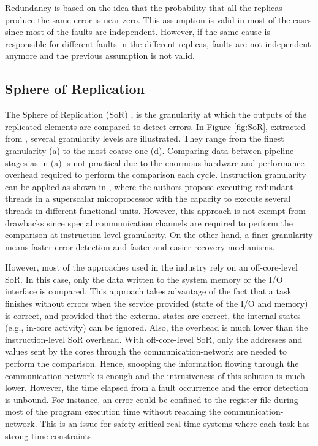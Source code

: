 Redundancy is based on the idea that the probability that all the replicas produce the same error is near zero. This assumption is valid in most of the cases since most of the faults are independent. However, if the same cause is responsible for different faults in the different replicas, faults are not independent anymore and the previous assumption is not valid.

\bigskip


\subsection{Sphere of Replication}
\label{section:SoR}

The Sphere of Replication (SoR) \cite{hernandez2014live}, is the granularity at which the outputs of the replicated elements are compared to detect errors. In Figure \ref{fig:SoR}, extracted from \cite{hernandez2014live}, several granularity levels are illustrated. They range from the finest granularity (a) to the most coarse one (d). Comparing data between pipeline stages as in (a) is not practical due to the enormous hardware and performance overhead required to perform the comparison each cycle. Instruction granularity can be applied as shown in \cite{reinhardt2000transient}, where the authors propose executing redundant threads in a superscalar microprocessor with the capacity to execute several threads in different functional units. However, this approach is not exempt from drawbacks since special communication channels are required to perform the comparison at instruction-level granularity. On the other hand, a finer granularity means faster error detection and faster and easier recovery mechanisms. 

However, most of the approaches used in the industry rely on an off-core-level SoR. In this case, only the data written to the system memory or the I/O interface is compared. This approach takes advantage of the fact that a task finishes without errors when the service provided (state of the I/O and memory) is correct, and provided that the external states are correct, the internal states (e.g., in-core activity) can be ignored. Also, the overhead is much lower than the instruction-level SoR overhead. With off-core-level SoR, only the addresses and values sent by the cores through the communication-network are needed to perform the comparison. Hence, snooping the information flowing through the communication-network is enough and the intrusiveness of this solution is much lower. However, the time elapsed from a fault occurrence and the error detection is unbound. For instance, an error could be confined to the register file during most of the program execution time without reaching the communication-network. This is an issue for safety-critical real-time systems where each task has strong time constraints.

